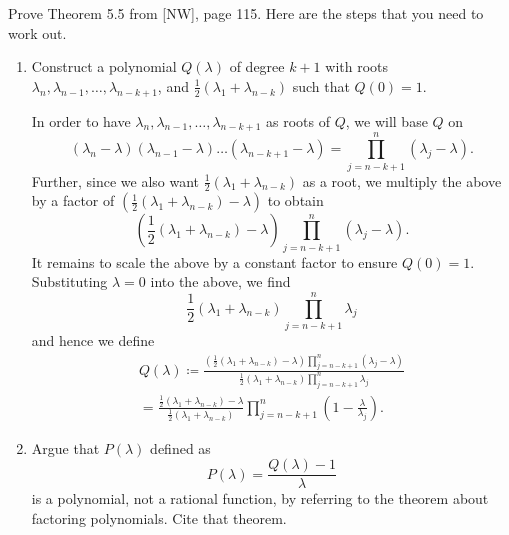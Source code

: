 \documentclass{../../../kin_math}
\begin{document}
\begin{questions}
  \question Prove Theorem 5.5 from [NW], page 115. Here are the steps that you need to work out.
  \begin{enumerate}
    \item Construct a polynomial $Q(\lambda)$ of degree $k + 1$ with roots $\lambda_n, \lambda_{n - 1}, \dots, \lambda_{n - k + 1}$, and $\frac{1}{2}(\lambda_1 + \lambda_{n - k})$ such that $Q(0) = 1$.
    \begin{solution}
      In order to have $\lambda_n, \lambda_{n - 1}, \dots, \lambda_{n - k + 1}$ as roots of $Q$, we will base $Q$ on
      \begin{equation*}
        (\lambda_n - \lambda)(\lambda_{n - 1} - \lambda) \dots (\lambda_{n - k + 1} - \lambda) = \prod_{j = n - k + 1}^n (\lambda_{j} - \lambda).
      \end{equation*}
      Further, since we also want $\frac{1}{2}(\lambda_1 + \lambda_{n - k})$ as a root, we multiply the above by a factor of $\left(\frac{1}{2}(\lambda_1 + \lambda_{n - k}) - \lambda \right)$ to obtain
      \begin{equation*}
        \left(\frac{1}{2}(\lambda_1 + \lambda_{n - k}) - \lambda \right) \prod_{j = n - k + 1}^n (\lambda_j - \lambda).
      \end{equation*}
      It remains to scale the above by a constant factor to ensure $Q(0) = 1$. Substituting $\lambda = 0$ into the above, we find
      \begin{equation*}
        \frac{1}{2}(\lambda_1 + \lambda_{n - k}) \prod_{j = n - k + 1}^n \lambda_j
      \end{equation*}
      and hence we define
      \begin{multline*}
        Q(\lambda) \coloneqq \frac{\left(\frac{1}{2}(\lambda_1 + \lambda_{n - k}) - \lambda \right) \prod_{j = n - k + 1}^{n} (\lambda_j - \lambda)}{\frac{1}{2}(\lambda_1 + \lambda_{n - k}) \prod_{j = n - k + 1}^n \lambda_j} \\
        = \frac{\frac{1}{2}(\lambda_1 + \lambda_{n - k}) - \lambda}{\frac{1}{2}(\lambda_1 + \lambda_{n - k})} \prod_{j = n - k + 1}^n \left(1 - \frac{\lambda}{\lambda_j}\right).
      \end{multline*}
    \end{solution}
    \item Argue that $P(\lambda)$ defined as
    \begin{equation}
      P(\lambda) = \frac{Q(\lambda) - 1}{\lambda}
    \end{equation}
    is a polynomial, not a rational function, by referring to the theorem about factoring polynomials. Cite that theorem.

\end{enumerate}
\end{questions}
\end{document}
